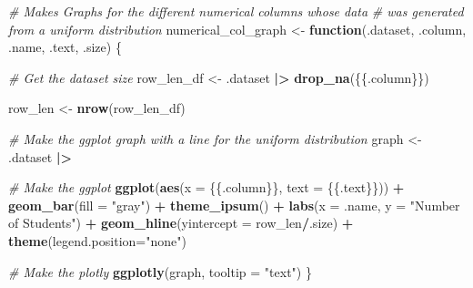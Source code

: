 \documentclass[
  twocolumn]{article}
\newenvironment{Shaded}{\begin{snugshade}}{\end{snugshade}}
\newcommand{\AttributeTok}[1]{\textcolor[rgb]{0.13,0.29,0.53}{#1}}
\newcommand{\CommentTok}[1]{\textcolor[rgb]{0.56,0.35,0.01}{\textit{#1}}}
\newcommand{\ControlFlowTok}[1]{\textcolor[rgb]{0.13,0.29,0.53}{\textbf{#1}}}
\newcommand{\FunctionTok}[1]{\textcolor[rgb]{0.13,0.29,0.53}{\textbf{#1}}}
\newcommand{\NormalTok}[1]{#1}
\newcommand{\OtherTok}[1]{\textcolor[rgb]{0.56,0.35,0.01}{#1}}
\newcommand{\SpecialCharTok}[1]{\textcolor[rgb]{0.81,0.36,0.00}{\textbf{#1}}}
\newcommand{\StringTok}[1]{\textcolor[rgb]{0.31,0.60,0.02}{#1}}
\begin{document}
\begin{Shaded}
\begin{Highlighting}[]
\CommentTok{\# Makes Graphs for the different numerical columns whose data}
\CommentTok{\# was generated from a uniform distribution}
\NormalTok{numerical\_col\_graph }\OtherTok{\textless{}{-}} \ControlFlowTok{function}\NormalTok{(.dataset, .column, .name, .text, .size) \{}
  
  \CommentTok{\# Get the dataset size}
\NormalTok{  row\_len\_df }\OtherTok{\textless{}{-}}\NormalTok{ .dataset }\SpecialCharTok{|\textgreater{}}
    \FunctionTok{drop\_na}\NormalTok{(\{\{.column\}\})}
  
\NormalTok{  row\_len }\OtherTok{\textless{}{-}} \FunctionTok{nrow}\NormalTok{(row\_len\_df)}

  \CommentTok{\# Make the ggplot graph with a line for the uniform distribution}
\NormalTok{  graph }\OtherTok{\textless{}{-}}\NormalTok{ .dataset }\SpecialCharTok{|\textgreater{}}
    
    \CommentTok{\# Make the ggplot}
    \FunctionTok{ggplot}\NormalTok{(}\FunctionTok{aes}\NormalTok{(}\AttributeTok{x =}\NormalTok{ \{\{.column\}\}, }\AttributeTok{text =}\NormalTok{ \{\{.text\}\})) }\SpecialCharTok{+}
    \FunctionTok{geom\_bar}\NormalTok{(}\AttributeTok{fill =} \StringTok{"gray"}\NormalTok{) }\SpecialCharTok{+}
    \FunctionTok{theme\_ipsum}\NormalTok{() }\SpecialCharTok{+}
    \FunctionTok{labs}\NormalTok{(}\AttributeTok{x =}\NormalTok{ .name, }\AttributeTok{y =} \StringTok{"Number of Students"}\NormalTok{) }\SpecialCharTok{+}
    \FunctionTok{geom\_hline}\NormalTok{(}\AttributeTok{yintercept =}\NormalTok{ row\_len}\SpecialCharTok{/}\NormalTok{.size) }\SpecialCharTok{+}
    \FunctionTok{theme}\NormalTok{(}\AttributeTok{legend.position=}\StringTok{"none"}\NormalTok{)}
  
  \CommentTok{\# Make the plotly}
  \FunctionTok{ggplotly}\NormalTok{(graph, }\AttributeTok{tooltip =} \StringTok{"text"}\NormalTok{)}
\NormalTok{\}}
\end{Highlighting}
\end{Shaded}
\end{document}
